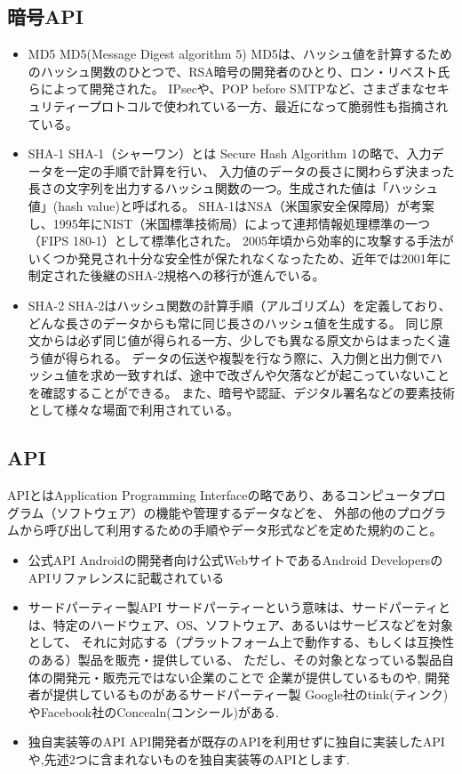 \subsection{暗号API}
\begin{itemize}
\item MD5
MD5(Message Digest algorithm 5)
MD5は、ハッシュ値を計算するためのハッシュ関数のひとつで、RSA暗号の開発者のひとり、ロン・リベスト氏らによって開発された。
IPsecや、POP before SMTPなど、さまざまなセキュリティープロトコルで使われている一方、最近になって脆弱性も指摘されている。
\item SHA-1
SHA-1（シャーワン）とは Secure Hash Algorithm 1の略で、入力データを一定の手順で計算を行い、
入力値のデータの長さに関わらず決まった長さの文字列を出力するハッシュ関数の一つ。生成された値は「ハッシュ値」(hash value)と呼ばれる。
SHA-1はNSA（米国家安全保障局）が考案し、1995年にNIST（米国標準技術局）によって連邦情報処理標準の一つ（FIPS 180-1）として標準化された。
2005年頃から効率的に攻撃する手法がいくつか発見され十分な安全性が保たれなくなったため、近年では2001年に制定された後継のSHA-2規格への移行が進んでいる。

\item SHA-2
SHA-2はハッシュ関数の計算手順（アルゴリズム）を定義しており、どんな長さのデータからも常に同じ長さのハッシュ値を生成する。
同じ原文からは必ず同じ値が得られる一方、少しでも異なる原文からはまったく違う値が得られる。
データの伝送や複製を行なう際に、入力側と出力側でハッシュ値を求め一致すれば、途中で改ざんや欠落などが起こっていないことを確認することができる。
また、暗号や認証、デジタル署名などの要素技術として様々な場面で利用されている。　

\end{itemize}

\subsection{API}
APIとはApplication Programming Interfaceの略であり、あるコンピュータプログラム（ソフトウェア）の機能や管理するデータなどを、
外部の他のプログラムから呼び出して利用するための手順やデータ形式などを定めた規約のこと。
\begin{itemize}
\item 公式API
Androidの開発者向け公式WebサイトであるAndroid DevelopersのAPIリファレンスに記載されている

\item サードパーティー製API
サードパーティーという意味は、サードパーティとは、特定のハードウェア、OS、ソフトウェア、あるいはサービスなどを対象として、
それに対応する（プラットフォーム上で動作する、もしくは互換性のある）製品を販売・提供している、
ただし、その対象となっている製品自体の開発元・販売元ではない企業のことで
企業が提供しているものや, 開発者が提供しているものがあるサードパーティー製 
Google社のtink(ティンク)やFacebook社のConcealn(コンシール)がある.
\item 独自実装等のAPI
API開発者が既存のAPIを利用せずに独自に実装したAPIや,先述2つに含まれないものを独自実装等のAPIとします.

\end{itemize}

